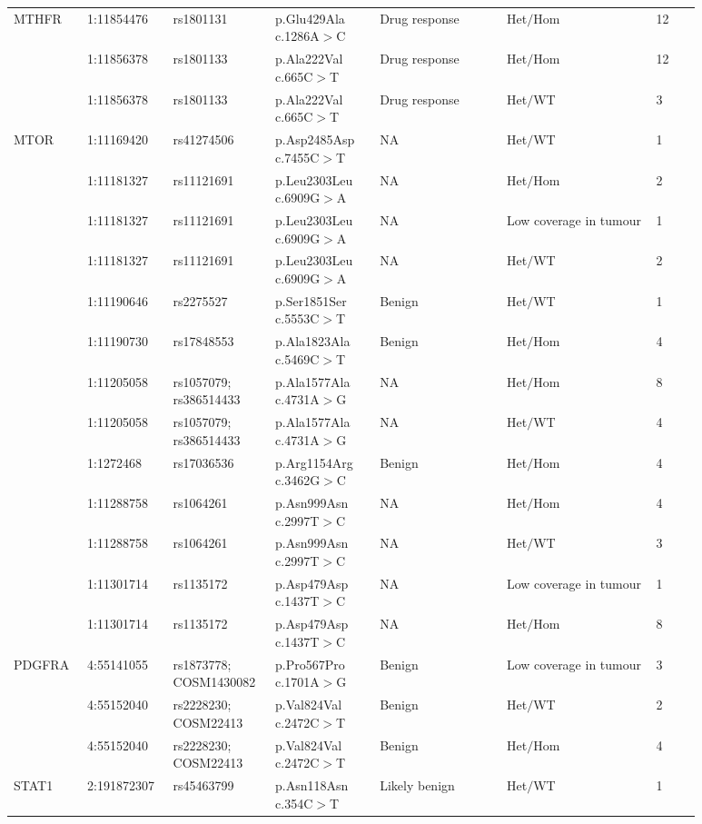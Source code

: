 \begin{landscape}
\begin{longtable}{p{0.09\linewidth}|p{0.1\linewidth}p{0.12\linewidth}p{0.14\linewidth}p{0.17\linewidth}p{0.2\linewidth}p{0.06\linewidth}}
		\\
		\hline
		MTHFR & 1:11854476 & rs1801131 & p.Glu429Ala c.1286A$>$C & Drug response & Het$/$Hom & 12
		\\
		& 1:11856378 & rs1801133 & p.Ala222Val c.665C$>$T & Drug response & Het$/$Hom & 12
		\\
		& 1:11856378 & rs1801133 & p.Ala222Val c.665C$>$T & Drug response & Het$/$WT & 3
		\\
		\hline
		MTOR & 1:11169420 & rs41274506 & p.Asp2485Asp c.7455C$>$T & NA & Het$/$WT & 1
		\\
		& 1:11181327 & rs11121691 & p.Leu2303Leu c.6909G$>$A & NA & Het$/$Hom & 2
		\\
		& 1:11181327 & rs11121691 & p.Leu2303Leu c.6909G$>$A & NA & Low coverage in tumour & 1
		\\
		& 1:11181327 & rs11121691 & p.Leu2303Leu c.6909G$>$A & NA & Het$/$WT & 2
		\\
		& 1:11190646 & rs2275527 & p.Ser1851Ser c.5553C$>$T & Benign & Het$/$WT & 1
		\\
		& 1:11190730 & rs17848553 & p.Ala1823Ala c.5469C$>$T & Benign & Het$/$Hom & 4
		\\
		& 1:11205058 & rs1057079; rs386514433 & p.Ala1577Ala c.4731A$>$G & NA & Het$/$Hom & 8
		\\
		& 1:11205058 & rs1057079; rs386514433 & p.Ala1577Ala c.4731A$>$G & NA & Het$/$WT & 4
		\\
		& 1:1272468 & rs17036536 & p.Arg1154Arg c.3462G$>$C & Benign & Het$/$Hom & 4
		\\
		& 1:11288758 & rs1064261 & p.Asn999Asn c.2997T$>$C & NA & Het$/$Hom & 4
		\\
		& 1:11288758 & rs1064261 & p.Asn999Asn c.2997T$>$C & NA & Het$/$WT & 3
		\\
		& 1:11301714 & rs1135172 & p.Asp479Asp c.1437T$>$C & NA & Low coverage in tumour & 1
		\\
		& 1:11301714 & rs1135172 & p.Asp479Asp c.1437T$>$C & NA & Het$/$Hom & 8
		\\
		\hline
		PDGFRA & 4:55141055 & rs1873778; COSM1430082 & p.Pro567Pro c.1701A$>$G & Benign & Low coverage in tumour & 3
		\\
		& 4:55152040 & rs2228230; COSM22413 & p.Val824Val c.2472C$>$T & Benign & Het$/$WT & 2
		\\
		& 4:55152040 & rs2228230; COSM22413 & p.Val824Val c.2472C$>$T & Benign & Het$/$Hom & 4
		\\
		\hline
		STAT1 & 2:191872307 & rs45463799 & p.Asn118Asn c.354C$>$T & Likely benign & Het$/$WT & 1

\end{longtable}
\end{landscape}
